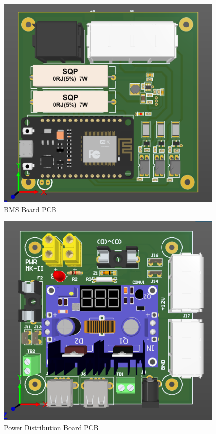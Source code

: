 \begin{figure}[h!]
	\centering
	\includegraphics[scale=0.8]{Figures/HW/pcb-bms.png}
	\caption{BMS Board PCB}
	\label{fig:hw-bms-pcb}
\end{figure}



\begin{figure}[h!]
	\centering
	\includegraphics[scale=0.8]{Figures/HW/pcb-power.png}
	\caption{Power Distribution Board PCB}
	\label{fig:hw-pwr-pcb}
\end{figure}

